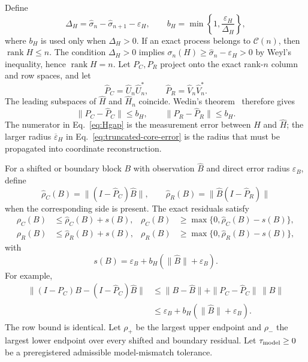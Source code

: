 \documentclass[aps,prl,onecolumn,superscriptaddress,nofootinbib]{revtex4-2}
\newcommand{\rank}{\operatorname{rank}}
\newcommand{\eps}{\varepsilon}
\newcommand{\cC}{\mathcal C}
\begin{document}
Define
\begin{equation}
 \Delta_H=\widehat\sigma_n-\widehat\sigma_{n+1}-\eps_H,
 \qquad
 b_H=\min\left\{1,\frac{\eps_H}{\Delta_H}\right\},
 \label{eq:Hgap}
\end{equation}
where $b_H$ is used only when $\Delta_H>0$.  If an exact process belongs to $\cC(n)$, then $\rank H\le n$.  The condition $\Delta_H>0$ implies
$\sigma_n(H)\ge\widehat\sigma_n-\eps_H>0$ by Weyl's inequality, hence $\rank H=n$.  Let $P_C,P_R$ project onto the exact rank-$n$ column and row spaces, and let
\begin{equation}
 \widehat P_C=\widehat U_n\widehat U_n^*,
 \qquad
 \widehat P_R=\widehat V_n\widehat V_n^*.
\end{equation}
The leading subspaces of $\widehat H$ and $\widehat H_n$ coincide.  Wedin's theorem~\cite{Wedin1972} therefore gives
\begin{equation}
 \|P_C-\widehat P_C\|\le b_H,
 \qquad
 \|P_R-\widehat P_R\|\le b_H.
 \label{eq:subspace-bounds}
\end{equation}
The numerator in Eq.~\eqref{eq:Hgap} is the measurement error between $H$ and $\widehat H$; the larger radius $\overline\eps_H$ in Eq.~\eqref{eq:truncated-core-error} is the radius that must be propagated into coordinate reconstruction.

For a shifted or boundary block $B$ with observation $\widehat B$ and direct error radius $\eps_B$, define
\begin{equation}
 \widehat\rho_C(B)=\|(I-\widehat P_C)\widehat B\|,
 \qquad
 \widehat\rho_R(B)=\|\widehat B(I-\widehat P_R)\|
 \label{eq:observed-residuals}
\end{equation}
when the corresponding side is present.  The exact residuals satisfy
\begin{align}
 \rho_C(B)&\le\widehat\rho_C(B)+s(B),&
 \rho_C(B)&\ge\max\{0,\widehat\rho_C(B)-s(B)\},\nonumber\\
 \rho_R(B)&\le\widehat\rho_R(B)+s(B),&
 \rho_R(B)&\ge\max\{0,\widehat\rho_R(B)-s(B)\},
 \label{eq:res-bracket}
\end{align}
with
\begin{equation}
 s(B)=\eps_B+b_H(\|\widehat B\|+\eps_B).
 \label{eq:res-slack}
\end{equation}
For example,
\begin{align*}
 \|(I-P_C)B-(I-\widehat P_C)\widehat B\|
 &\le\|B-\widehat B\|+\|P_C-\widehat P_C\|\,\|B\|\\
 &\le\eps_B+b_H(\|\widehat B\|+\eps_B).
\end{align*}
The row bound is identical.  Let $\rho_+$ be the largest upper endpoint and $\rho_-$ the largest lower endpoint over every shifted and boundary residual.  Let $\tau_{\rm model}\ge0$ be a preregistered admissible model-mismatch tolerance.
\end{document}
